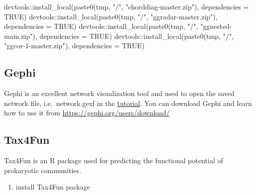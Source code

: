 \documentclass[
]{book}
\newenvironment{Shaded}{\begin{snugshade}}{\end{snugshade}}
\newcommand{\AttributeTok}[1]{\textcolor[rgb]{0.77,0.63,0.00}{#1}}
\newcommand{\ConstantTok}[1]{\textcolor[rgb]{0.00,0.00,0.00}{#1}}
\newcommand{\FunctionTok}[1]{\textcolor[rgb]{0.00,0.00,0.00}{#1}}
\newcommand{\NormalTok}[1]{#1}
\newcommand{\SpecialCharTok}[1]{\textcolor[rgb]{0.00,0.00,0.00}{#1}}
\newcommand{\StringTok}[1]{\textcolor[rgb]{0.31,0.60,0.02}{#1}}
\providecommand{\tightlist}{%
  \setlength{\itemsep}{0pt}\setlength{\parskip}{0pt}}
\begin{document}
\begin{Shaded}
\begin{Highlighting}[]
\NormalTok{devtools}\SpecialCharTok{::}\FunctionTok{install\_local}\NormalTok{(}\FunctionTok{paste0}\NormalTok{(tmp, }\StringTok{"/"}\NormalTok{, }\StringTok{"chorddiag{-}master.zip"}\NormalTok{), }\AttributeTok{dependencies =} \ConstantTok{TRUE}\NormalTok{)}
\NormalTok{devtools}\SpecialCharTok{::}\FunctionTok{install\_local}\NormalTok{(}\FunctionTok{paste0}\NormalTok{(tmp, }\StringTok{"/"}\NormalTok{, }\StringTok{"ggradar{-}master.zip"}\NormalTok{), }\AttributeTok{dependencies =} \ConstantTok{TRUE}\NormalTok{)}
\NormalTok{devtools}\SpecialCharTok{::}\FunctionTok{install\_local}\NormalTok{(}\FunctionTok{paste0}\NormalTok{(tmp, }\StringTok{"/"}\NormalTok{, }\StringTok{"ggnested{-}main.zip"}\NormalTok{), }\AttributeTok{dependencies =} \ConstantTok{TRUE}\NormalTok{)}
\NormalTok{devtools}\SpecialCharTok{::}\FunctionTok{install\_local}\NormalTok{(}\FunctionTok{paste0}\NormalTok{(tmp, }\StringTok{"/"}\NormalTok{, }\StringTok{"ggcor{-}1{-}master.zip"}\NormalTok{), }\AttributeTok{dependencies =} \ConstantTok{TRUE}\NormalTok{)}
\end{Highlighting}
\end{Shaded}

\hypertarget{gephi}{%
\subsection{Gephi}\label{gephi}}

Gephi is an excellent network visualization tool and used to open the saved network file,
i.e.~network.gexf in the \href{https://chiliubio.github.io/microeco_tutorial/model-based-class.html\#trans_network-class}{tutorial}.
You can download Gephi and learn how to use it from \url{https://gephi.org/users/download/}

\hypertarget{tax4fun}{%
\subsection{Tax4Fun}\label{tax4fun}}

Tax4Fun is an R package used for predicting the functional potential of prokaryotic communities.

\begin{enumerate}
\def\labelenumi{\arabic{enumi}.}
\tightlist
\item
  install Tax4Fun package
\end{enumerate}
\end{document}
